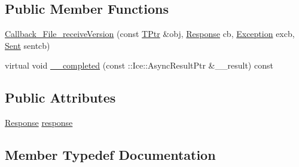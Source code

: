 \subsection*{Public Member Functions}
\begin{DoxyCompactItemize}
\item 
\hyperlink{class_file_system_1_1_callback___file__receive_version_a9502b37276feb5e696f8c52b718d2c15}{Callback\+\_\+\+File\+\_\+receive\+Version} (const \hyperlink{class_file_system_1_1_callback___file__receive_version_ad3c99b998d7a847dca7193dd3cad8cf1}{T\+Ptr} \&obj, \hyperlink{class_file_system_1_1_callback___file__receive_version_ab5743b6627d5fde356fc7381fcc4613a}{Response} cb, \hyperlink{class_file_system_1_1_callback___file__receive_version_a8ec034c43b3913243caf48c7de06f99d}{Exception} excb, \hyperlink{class_file_system_1_1_callback___file__receive_version_a70f13401fd06a120da116b0b17ea67d0}{Sent} sentcb)
\item 
virtual void \hyperlink{class_file_system_1_1_callback___file__receive_version_a76eea8d794fd8efa88cf529d77c04510}{\+\_\+\+\_\+completed} (const \+::Ice\+::\+Async\+Result\+Ptr \&\+\_\+\+\_\+result) const 
\end{DoxyCompactItemize}
\subsection*{Public Attributes}
\begin{DoxyCompactItemize}
\item 
\hyperlink{class_file_system_1_1_callback___file__receive_version_ab5743b6627d5fde356fc7381fcc4613a}{Response} \hyperlink{class_file_system_1_1_callback___file__receive_version_a8d059b5bb0d7ce620eb896bf2e3d32dc}{response}
\end{DoxyCompactItemize}


\subsection{Member Typedef Documentation}
\hypertarget{class_file_system_1_1_callback___file__receive_version_a8ec034c43b3913243caf48c7de06f99d}{}
